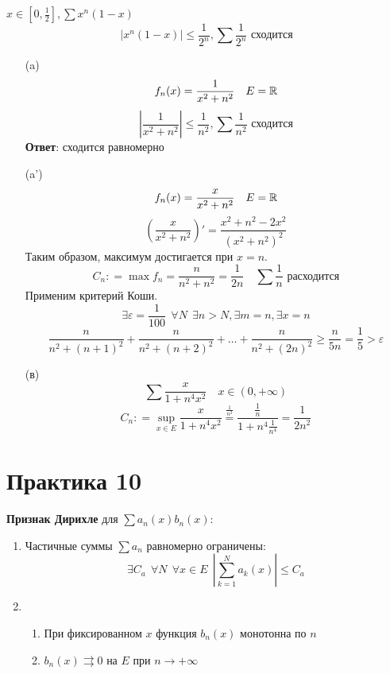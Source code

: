 \begin{example}
    \(x\in [0, \frac{1}{2}], \sum x^n(1 - x)\)
    \[|x^n(1 - x)| \leq \frac{1}{2^n}, \sum \frac{1}{2^n} \text{ сходится}\]
\end{example}

\begin{exercise}[2774]\itemfix
    \begin{itemize}
        \item [(a)] \[f_n(x) = \frac{1}{x^2 + n^2} \quad E = \mathbb{R}\]
              \[\left|\frac{1}{x^2 + n^2}\right| \leq \frac{1}{n^2}, \sum \frac{1}{n^2} \text{ сходится}\]
              \textbf{Ответ}: сходится равномерно
        \item [(a')] \[f_n(x) = \frac{x}{x^2 + n^2} \quad E = \mathbb{R}\]
              \[\left(\frac{x}{x^2 + n^2}\right)' = \frac{x^2 + n^2 - 2x^2}{(x^2 + n^2)^2} \]
              Таким образом, максимум достигается при \(x = n\).
              \[C_n: = \max f_n = \frac{n}{n^2 + n^2} = \frac{1}{2n} \quad \sum \frac{1}{n} \text{ расходится}\]
              Применим критерий Коши.
              \[\exists \varepsilon = \frac{1}{100}  \ \ \forall N \ \ \exists n > N, \exists m = n, \exists x = n\]
              \[\frac{n}{n^2 + (n + 1)^2} + \frac{n}{n^2 + (n + 2)^2} + \dots + \frac{n}{n^2 + (2n)^2} \ge \frac{n}{5n} = \frac{1}{5} > \varepsilon\]


        \item [(в)] \[\sum \frac{x}{1 + n^4x^2} \quad x\in (0, +\infty)\]
              \[C_n: = \sup_{x\in E} \frac{x}{1 + n^4x^2} \stackrel{\frac{1}{n^2}}= \frac{\frac{1}{n}}{1 + n^4 \frac{1}{n^4}} = \frac{1}{2n^2}\]
    \end{itemize}
\end{exercise}

\section*{Практика 10}

\textbf{Признак Дирихле} для \(\sum a_n(x)b_n(x)\):
\begin{enumerate}
    \item Частичные суммы \(\sum a_n\) равномерно ограничены:
          \[\exists C_a \ \ \forall N \ \ \forall x\in E \ \ \left|\sum_{k = 1}^N a_k(x)\right| \leq C_a\]
    \item \begin{enumerate}
              \item При фиксированном \(x\) функция \(b_n(x)\) монотонна по \(n\)
              \item \(b_n(x) \rightrightarrows 0\) на \(E\) при \(n\to +\infty\)
          \end{enumerate}
\end{enumerate}

